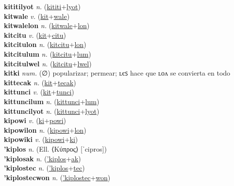 \textbf{kititilyot} \textit{n.} (\hyperref[kititi]{kititi}+\hyperref[lyot]{lyot})
 \label{kititilyot} \\
\textbf{kitwale} \textit{v.} (\hyperref[kit]{kit}+\hyperref[wale]{wale})
 \label{kitwale} \\
\textbf{kitwalelon} \textit{n.} (\hyperref[kitwale]{kitwale}+\hyperref[lon]{lon})
 \label{kitwalelon} \\
\textbf{kitcitu} \textit{v.} (\hyperref[kit]{kit}+\hyperref[citu]{citu})
 \label{kitcitu} \\
\textbf{kitcitulon} \textit{n.} (\hyperref[kitcitu]{kitcitu}+\hyperref[lon]{lon})
 \label{kitcitulon} \\
\textbf{kitcitulum} \textit{n.} (\hyperref[kitcitu]{kitcitu}+\hyperref[lum]{lum})
 \label{kitcitulum} \\
\textbf{kitcitulwel} \textit{n.} (\hyperref[kitcitu]{kitcitu}+\hyperref[lwel]{lwel})
 \label{kitcitulwel} \\
\textbf{kitki} \textit{num.} (∅)
popularizar; permear; ʟєꜱ hace que ʟᴏᴧ se convierta en todo \label{kitki} \\
\textbf{kittecak} \textit{n.} (\hyperref[kit]{kit}+\hyperref[tecak]{tecak})
 \label{kittecak} \\
\textbf{kittunci} \textit{v.} (\hyperref[kit]{kit}+\hyperref[tunci]{tunci})
 \label{kittunci} \\
\textbf{kittuncilum} \textit{n.} (\hyperref[kittunci]{kittunci}+\hyperref[lum]{lum})
 \label{kittuncilum} \\
\textbf{kittuncilyot} \textit{n.} (\hyperref[kittunci]{kittunci}+\hyperref[lyot]{lyot})
 \label{kittuncilyot} \\
\textbf{kipowi} \textit{v.} (\hyperref[ki]{ki}+\hyperref[powi]{powi})
 \label{kipowi} \\
\textbf{kipowilon} \textit{n.} (\hyperref[kipowi]{kipowi}+\hyperref[lon]{lon})
 \label{kipowilon} \\
\textbf{kipowiki} \textit{v.} (\hyperref[kipowi]{kipowi}+\hyperref[ki]{ki})
 \label{kipowiki} \\
\textbf{'kiplos} \textit{n.} (Ell. ⟨Κύπρος⟩ [ˈcipros])
 \label{'kiplos} \\
\textbf{'kiplosak} \textit{n.} (\hyperref['kiplos]{'kiplos}+\hyperref[ak]{ak})
 \label{'kiplosak} \\
\textbf{'kiplostec} \textit{n.} (\hyperref['kiplos]{'kiplos}+\hyperref[tec]{tec})
 \label{'kiplostec} \\
\textbf{'kiplostecwon} \textit{n.} (\hyperref['kiplostec]{'kiplostec}+\hyperref[won]{won})
